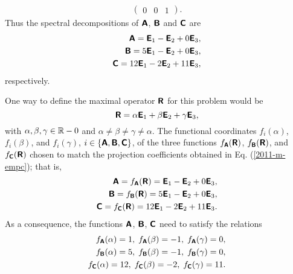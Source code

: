 {\begin{equation}
\begin{split}
\begin{pmatrix}
0& 0& 1
\end{pmatrix}.
\end{split}
\end{equation}
Thus the spectral decompositions of
$\textsf{\textbf{A}}$,
$\textsf{\textbf{B}}$  and
$\textsf{\textbf{C}}$ are
\begin{equation}
\begin{split}
\textsf{\textbf{A}}= \textsf{\textbf{E}}_1  - \textsf{\textbf{E}}_2  + 0  \textsf{\textbf{E}}_3,\\
\textsf{\textbf{B}}= 5\textsf{\textbf{E}}_1  - \textsf{\textbf{E}}_2  + 0 \textsf{\textbf{E}}_3,\\
\textsf{\textbf{C}}= 12\textsf{\textbf{E}}_1  -2 \textsf{\textbf{E}}_2  + 11\textsf{\textbf{E}}_3,
\end{split}
\label{2011-m-empc}
\end{equation}
respectively.


One way to define the  maximal operator  $\textsf{\textbf{R}}$ for this problem
would be
$$
\textsf{\textbf{R}} = \alpha \textsf{\textbf{E}}_1  + \beta \textsf{\textbf{E}}_2  + \gamma  \textsf{\textbf{E}}_3,
$$
with
$\alpha ,  \beta ,   \gamma \in {\Bbb R}-0$ and
$\alpha  \neq \beta  \neq   \gamma \neq \alpha  $.
The functional coordinates
$f_i(\alpha )$, $f_i(\beta)$, and $f_i(\gamma)$,
$i\in \{\textsf{\textbf{A}},\textsf{\textbf{B}},\textsf{\textbf{C}}\}$,  of the three functions
$ f_\textsf{\textbf{A}}(\textsf{\textbf{R}})$,
$ f_\textsf{\textbf{B}}(\textsf{\textbf{R}})$, and
$ f_\textsf{\textbf{C}}(\textsf{\textbf{R}})$
chosen to match the projection coefficients obtained in Eq. (\ref{2011-m-empc});
that is,
\begin{equation}
\begin{split}
\textsf{\textbf{A}}= f_\textsf{\textbf{A}}(\textsf{\textbf{R}})=  \textsf{\textbf{E}}_1  - \textsf{\textbf{E}}_2  + 0  \textsf{\textbf{E}}_3,\\
\textsf{\textbf{B}}=  f_\textsf{\textbf{B}}(\textsf{\textbf{R}})= 5\textsf{\textbf{E}}_1  - \textsf{\textbf{E}}_2  + 0 \textsf{\textbf{E}}_3,\\
\textsf{\textbf{C}}=  f_\textsf{\textbf{C}}(\textsf{\textbf{R}})= 12\textsf{\textbf{E}}_1  -2 \textsf{\textbf{E}}_2  + 11\textsf{\textbf{E}}_3.
\end{split}
\end{equation}
As a consequence, the functions
$\textsf{\textbf{A}}$,
$\textsf{\textbf{B}}$,
$\textsf{\textbf{C}}$ need to satisfy the relations
\begin{equation}
\begin{split}
f_\textsf{\textbf{A}}(\alpha ) =1,\; f_\textsf{\textbf{A}}(\beta ) =-1,\; f_\textsf{\textbf{A}}(\gamma ) =0,\\
f_\textsf{\textbf{B}}(\alpha ) =5,\; f_\textsf{\textbf{B}}(\beta ) =-1,\; f_\textsf{\textbf{B}}(\gamma ) =0,\\
f_\textsf{\textbf{C}}(\alpha ) =12,\; f_\textsf{\textbf{C}}(\beta ) =-2,\; f_\textsf{\textbf{C}}(\gamma ) =11.
\end{split}
\label{2011-m-empc-fsr}
\end{equation}

}

